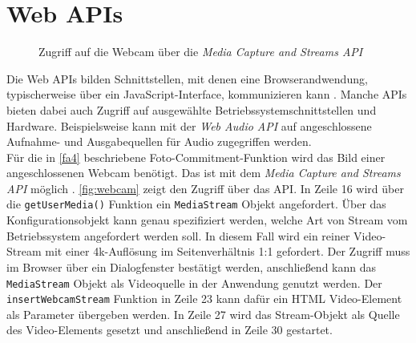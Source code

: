 \section{Web APIs}
\label{sec:web-apis}

\begin{figure}
  
  \caption{Zugriff auf die Webcam über die \emph{Media Capture and Streams API}}
  \label{fig:webcam}
\end{figure}

Die Web APIs bilden Schnittstellen, mit denen eine Browserandwendung, typischerweise über ein JavaScript-Interface,
kommunizieren kann \cite{web-apis}. Manche APIs bieten dabei auch Zugriff auf ausgewählte 
Betriebssystemschnittstellen und Hardware. Beispielsweise kann mit der \emph{Web Audio API} auf 
angeschlossene Aufnahme- und Ausgabequellen für Audio zugegriffen werden.\\
Für die in \ref{fa4} beschriebene
Foto-Commitment-Funktion wird das Bild einer angeschlossenen Webcam benötigt. Das ist mit dem \emph{Media Capture and 
Streams API} möglich \cite{media-stream}. \autoref{fig:webcam} zeigt den Zugriff über das API. In Zeile 16 wird 
über die \texttt{getUserMedia()} Funktion ein \texttt{MediaStream} Objekt angefordert. Über das Konfigurationsobjekt
kann genau spezifiziert werden, welche Art von Stream vom Betriebssystem angefordert werden soll. In diesem Fall
wird ein reiner Video-Stream mit einer 4k-Auflösung im Seitenverhältnis 1:1 gefordert. Der Zugriff muss 
im Browser über ein Dialogfenster bestätigt werden, anschließend kann das \texttt{MediaStream} Objekt als
Videoquelle in der Anwendung genutzt werden. Der \texttt{insertWebcamStream} Funktion in Zeile 23 kann dafür
ein HTML Video-Element als Parameter übergeben werden. In Zeile 27 wird das Stream-Objekt als Quelle
des Video-Elements gesetzt und anschließend in Zeile 30 gestartet.

\iffalse
- Web USB
- 
\fi